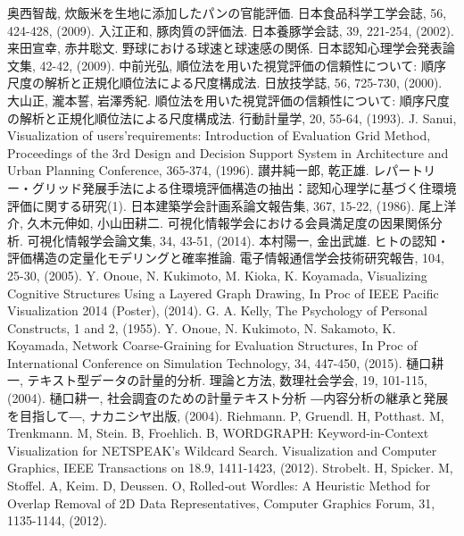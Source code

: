 \documentclass[syuuron]{kuee}
\begin{document}


\begin{thebibliography}{数字}
	 奥西智哉, 炊飯米を生地に添加したパンの官能評価. 日本食品科学工学会誌, 56, 424-428, (2009).
	 入江正和, 豚肉質の評価法. 日本養豚学会誌, 39, 221-254, (2002).
	 来田宣幸, 赤井聡文. 野球における球速と球速感の関係. 日本認知心理学会発表論文集, 42-42, (2009).
	 中前光弘, 順位法を用いた視覚評価の信頼性について: 順序尺度の解析と正規化順位法による尺度構成法. 日放技学誌, 56, 725-730, (2000).
	 大山正, 瀧本誓, 岩澤秀紀. 順位法を用いた視覚評価の信頼性について: 順序尺度の解析と正規化順位法による尺度構成法. 行動計量学, 20, 55-64, (1993).
	 J. Sanui, Visualization of users’requirements: Introduction of Evaluation Grid Method, Proceedings of the 3rd Design and Decision Support System in Architecture and Urban Planning Conference, 365-374, (1996).
	 讃井純一郎, 乾正雄. レパートリー・グリッド発展手法による住環境評価構造の抽出：認知心理学に基づく住環境評価に関する研究(1). 日本建築学会計画系論文報告集, 367, 15-22, (1986).
	 尾上洋介, 久木元伸如, 小山田耕二. 可視化情報学会における会員満足度の因果関係分析. 可視化情報学会論文集, 34, 43-51, (2014).
	 本村陽一, 金出武雄. ヒトの認知・評価構造の定量化モデリングと確率推論. 電子情報通信学会技術研究報告, 104, 25-30, (2005).
	 Y. Onoue, N. Kukimoto, M. Kioka, K. Koyamada, Visualizing Cognitive Structures Using a Layered Graph Drawing, In Proc of IEEE Pacific Visualization 2014 (Poster), (2014).
	 G. A. Kelly, The Psychology of Personal Constructs, 1 and 2, (1955).
	 Y. Onoue, N. Kukimoto, N. Sakamoto, K. Koyamada, Network Coarse-Graining for Evaluation Structures, In Proc of International Conference on Simulation Technology, 34, 447-450, (2015). 
	 樋口耕一, テキスト型データの計量的分析. 理論と方法, 数理社会学会, 19, 101-115, (2004).
	 樋口耕一, 社会調査のための計量テキスト分析 ―内容分析の継承と発展を目指して―, ナカニシヤ出版, (2004).
	 Riehmann. P, Gruendl. H, Potthast. M, Trenkmann. M, Stein. B, Froehlich. B, WORDGRAPH: Keyword-in-Context Visualization for NETSPEAK's Wildcard Search. Visualization and Computer Graphics, IEEE Transactions on 18.9, 1411-1423, (2012).
	 Strobelt. H, Spicker. M, Stoffel. A, Keim. D, Deussen. O, Rolled‐out Wordles: A Heuristic Method for Overlap Removal of 2D Data Representatives, Computer Graphics Forum, 31, 1135-1144, (2012).

\end{thebibliography}
\end{document}
